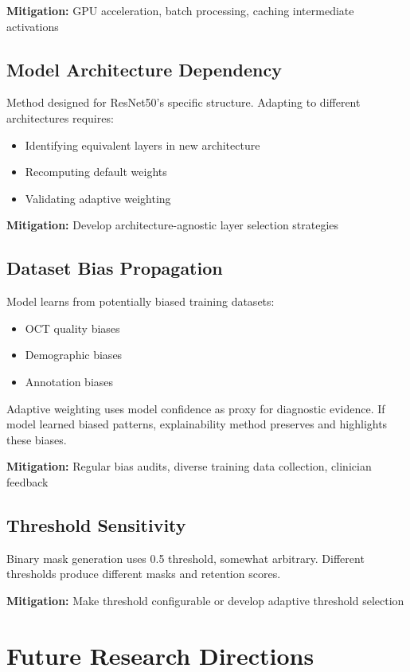 \documentclass[12pt,a4paper,oneside]{book}
\begin{document}
\textbf{Mitigation:} GPU acceleration, batch processing, caching intermediate activations

\subsection{Model Architecture Dependency}

Method designed for ResNet50's specific structure. Adapting to different architectures requires:
\begin{itemize}
  \item Identifying equivalent layers in new architecture
  \item Recomputing default weights
  \item Validating adaptive weighting
\end{itemize}

\textbf{Mitigation:} Develop architecture-agnostic layer selection strategies

\subsection{Dataset Bias Propagation}

Model learns from potentially biased training datasets:
\begin{itemize}
  \item OCT quality biases
  \item Demographic biases
  \item Annotation biases
\end{itemize}

Adaptive weighting uses model confidence as proxy for diagnostic evidence. If model learned biased patterns, explainability method preserves and highlights these biases.

\textbf{Mitigation:} Regular bias audits, diverse training data collection, clinician feedback

\subsection{Threshold Sensitivity}

Binary mask generation uses 0.5 threshold, somewhat arbitrary. Different thresholds produce different masks and retention scores.

\textbf{Mitigation:} Make threshold configurable or develop adaptive threshold selection

\section{Future Research Directions}
\end{document}
